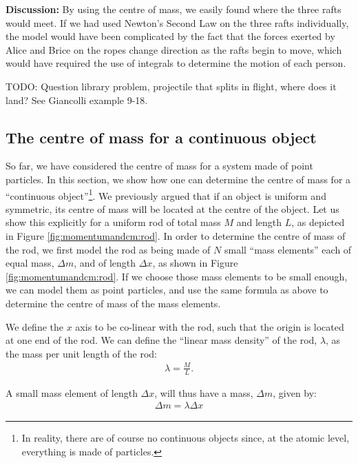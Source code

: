 \begin{example}
\textbf{Discussion: }By using the centre of mass, we easily found where the three rafts would meet. If we had used Newton's Second Law on the three rafts individually, the model would have been complicated by the fact that the forces exerted by Alice and Brice on the ropes change direction as the rafts begin to move, which would have required the use of integrals to determine the motion of each person.
\end{example}
TODO: Question library problem, projectile that splits in flight, where does it land? See Giancolli example 9-18.

\subsection{The centre of mass for a continuous object}
So far, we have considered the centre of mass for a system made of point particles. In this section, we show how one can determine the centre of mass for a ``continuous object''\footnote{In reality, there are of course no continuous objects since, at the atomic level, everything is made of particles.}. We previously argued that if an object is uniform and symmetric, its centre of mass will be located at the centre of the object. Let us show this explicitly for a uniform rod of total mass $M$ and length $L$, as depicted in Figure \ref{fig:momentumandcm:rod}.
In order to determine the centre of mass of the rod, we first model the rod as being made of $N$ small ``mass elements'' each of equal mass, $\Delta m$, and of length $\Delta x$, as shown in Figure \ref{fig:momentumandcm:rod}. If we choose those mass elements to be small enough, we can model them as point particles, and use the same formula as above to determine the centre of mass of the mass elements.

We define the $x$ axis to be co-linear with the rod, such that the origin is located at one end of the rod. We can define the ``linear mass density'' of the rod, $\lambda$, as the mass per unit length of the rod:
\begin{align*}
\lambda = \frac{M}{L}.
\end{align*}

A small mass element of length $\Delta x$, will thus have a mass, $\Delta m$, given by:
\begin{align*}
\Delta m = \lambda \Delta x 
\end{align*}

